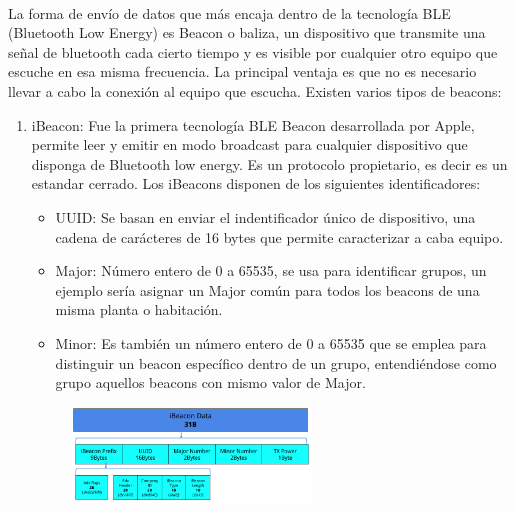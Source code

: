\documentclass[a4paper ,12pt, onecolumn]{article}
\begin{document}
            \paragraph{}
            La forma de envío de datos que más encaja dentro de la tecnología BLE (Bluetooth Low Energy) es Beacon o baliza, un 
            dispositivo que transmite una señal de bluetooth cada cierto tiempo y es visible por cualquier otro equipo que escuche 
            en esa misma frecuencia. La principal ventaja es que no es necesario llevar a cabo la conexión al equipo que escucha.
            Existen varios tipos de beacons:
            \begin{enumerate}
                \item iBeacon: Fue la primera tecnología BLE Beacon desarrollada por Apple, permite leer y emitir en modo 
                broadcast para cualquier dispositivo que disponga de Bluetooth low energy. Es un protocolo propietario, es 
                decir es un estandar cerrado. 
                Los iBeacons disponen de los siguientes identificadores:
                \begin{itemize}
                    \item UUID: Se basan en enviar el indentificador único de dispositivo, una cadena de
                    carácteres de 16 bytes que permite caracterizar a caba equipo.
                    \item Major: Número entero de 0 a 65535, se usa para identificar grupos, un ejemplo sería 
                    asignar un Major común para todos los beacons de una misma planta o habitación.
                    \item Minor: Es también un número entero de 0 a 65535 que se emplea para distinguir un beacon
                    específico dentro de un grupo, entendiéndose como grupo aquellos beacons con mismo valor de Major.
                \end{itemize}
                \begin{center}
                    \begin{figure}[ht]
                        \centering
                        \includegraphics[width=0.6\textwidth]{tipos_beacon_ibeacon.PNG}

\end{figure}
\end{center}
\end{enumerate}
\end{document}
